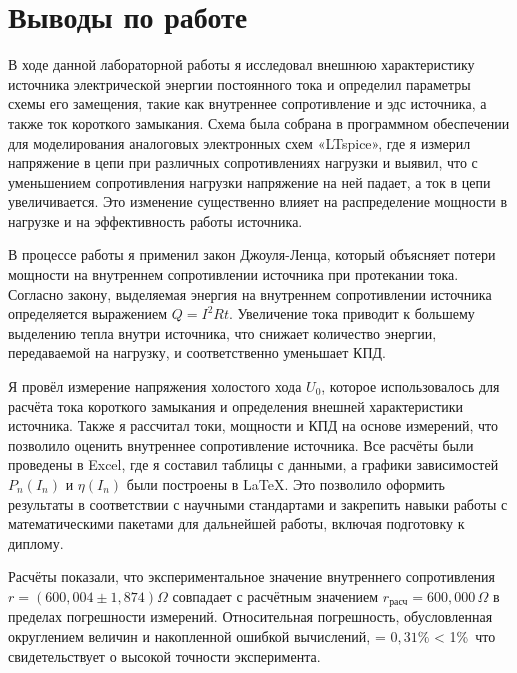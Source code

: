 \documentclass[a4paper]{article}
\begin{document}


% 
% 


\section{Выводы по работе}

В ходе данной лабораторной работы я исследовал внешнюю характеристику источника электрической
энергии постоянного тока и определил параметры схемы его замещения, такие как внутреннее сопротивление и эдс источника, а также ток короткого замыкания. Схема была собрана в программном обеспечении для моделирования аналоговых электронных
схем «LTspice», где я измерил напряжение в цепи при различных сопротивлениях нагрузки
и выявил, что с уменьшением сопротивления нагрузки напряжение на ней падает,
а ток в цепи увеличивается. Это изменение существенно влияет на распределение мощности в
нагрузке и на эффективность работы источника.

В процессе работы я применил закон Джоуля-Ленца,
который объясняет потери мощности на внутреннем сопротивлении источника при протекании тока.
Согласно закону, выделяемая энергия на внутреннем сопротивлении источника определяется
выражением \(Q = I^2 R t\). Увеличение тока приводит к большему выделению тепла внутри источника,
что снижает количество энергии, передаваемой на нагрузку, и соответственно уменьшает КПД.

Я провёл измерение напряжения холостого хода \( U_0 \),
которое использовалось для расчёта тока короткого замыкания
и определения внешней характеристики источника.
Также я рассчитал токи, мощности и КПД на основе измерений,
что позволило оценить внутреннее сопротивление источника.
Все расчёты были проведены в Excel, где я составил таблицы с данными, а графики зависимостей
\( P_n(I_n) \) и \( \eta(I_n) \) были построены в LaTeX.
Это позволило оформить результаты в соответствии с научными стандартами и
закрепить навыки работы с математическими пакетами для дальнейшей работы,
включая подготовку к диплому.

Расчёты показали, что экспериментальное значение внутреннего сопротивления \(r = (600{,}004 \pm 1{,}874) \Omega \) совпадает с расчётным значением \( r_{\text{расч}} = 600{,}000\,\Omega \) в пределах погрешности измерений. Относительная погрешность, обусловленная округлением величин и накопленной ошибкой вычислений, \varepsilon = \(0{,}31\%\) < 1\%\, что свидетельствует о высокой точности эксперимента.
\end{document}
